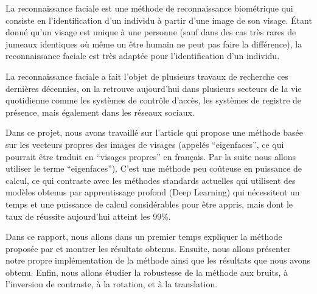 La reconnaissance faciale est une méthode de reconnaissance biométrique
qui consiste en l'identification d'un individu à partir d'une image de son
visage. Étant donné qu'un visage est unique à une personne (sauf dans des cas très
rares de jumeaux identiques où même un être humain ne peut pas faire 
la différence), la reconnaissance faciale est très adaptée pour l'identification
d'un individu.

La reconnaissance faciale a fait l'objet de plusieurs travaux de recherche ces dernières décennies,
on la retrouve aujourd'hui dans plusieurs secteurs de la vie quotidienne comme les systèmes de
contrôle d'accès, les systèmes de registre de présence, mais également dans les réseaux sociaux.

Dans ce projet, nous avons travaillé sur l'article \cite{article} qui propose une méthode
basée sur les vecteurs propres des images de visages (appelés ``eigenfaces'', ce qui pourrait être 
traduit en ``visages propres'' en français. Par la suite nous allons utiliser le terme ``eigenfaces'').
C'est une méthode peu coûteuse en puissance de calcul, ce qui contraste avec les méthodes standards
actuelles qui utilisent des modèles obtenus par apprentissage profond (Deep Learning) qui nécessitent un
temps et une puissance de calcul considérables pour être appris, mais dont le taux de réussite aujourd'hui
atteint les 99\%.

Dans ce rapport, nous allons dans un premier temps expliquer la méthode proposée par \cite{article} et
montrer les résultats obtenus. Ensuite, nous allons présenter notre propre implémentation de la méthode
ainsi que les résultats que nous avons obtenu. Enfin, nous allons étudier la robustesse de la méthode
aux bruits, à l'inversion de contraste, à la rotation, et à la translation.
